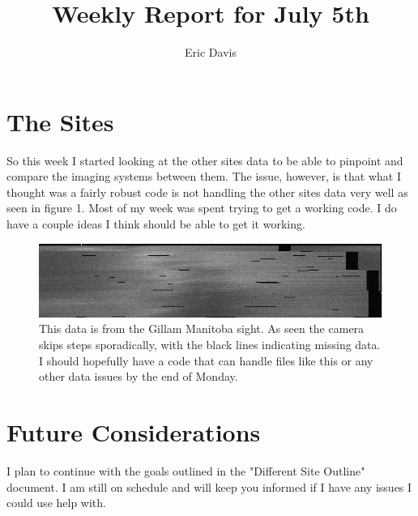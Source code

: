 \documentclass[11pt]{article}
\title{Weekly Report for July 5th}
\author{Eric Davis}
\begin{document}
\maketitle
\medskip



\section{The Sites}
\hspace{0.5cm}

So this week I started looking at the other sites data to be able to pinpoint and compare the imaging systems between them. The issue, however, is that what I thought was a fairly robust code is not handling the other sites data very well as seen in figure 1. Most of my week was spent trying to get a working code. I do have a couple ideas I think should be able to get it working. 

\begin{figure}[h!]
\includegraphics[scale=1.2]{bad_data.jpg}
\caption{This data is from the Gillam Manitoba sight. As seen the camera skips steps sporadically, with the black lines indicating missing data. I should hopefully have a code that can handle files like this or any other data issues by the end of Monday.}
\end{figure}



\section{Future Considerations}

I plan to continue with the goals outlined in the "Different Site Outline" document. I am still on schedule and will keep you informed if I have any issues I could use help with.
\end{document}
